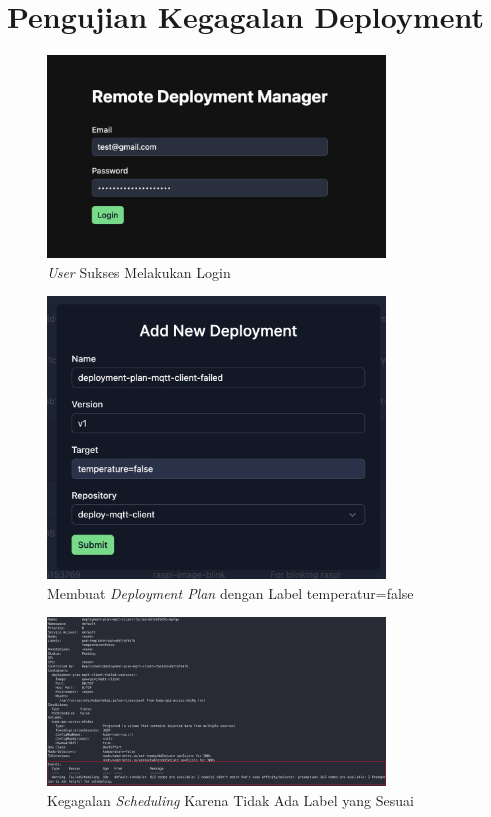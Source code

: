 \chapter{Pengujian Kegagalan Deployment}

\begin{figure}[ht]
  \centering
  \includegraphics[width=0.8\textwidth]{resources/chapter-4/pengujian/pengujian-sistem-gcp-03.jpg}
  \caption{\textit{User} Sukses Melakukan Login}
  \label{fig:pengujian-sistem-gagal-00}
\end{figure}

\begin{figure}[ht]
  \centering
  \includegraphics[width=0.8\textwidth]{resources/chapter-4/pengujian/pengujian-sistem-gagal-01.jpg}
  \caption{Membuat \textit{Deployment Plan} dengan Label temperatur=false}
  \label{fig:pengujian-sistem-gagal-01}
\end{figure}

\begin{figure}[ht]
  \centering
  \includegraphics[width=0.8\textwidth]{resources/chapter-4/pengujian/pengujian-sistem-gagal-02.png}
  \caption{Kegagalan \textit{Scheduling} Karena Tidak Ada Label yang Sesuai}
  \label{fig:pengujian-sistem-gagal-02}
\end{figure}

